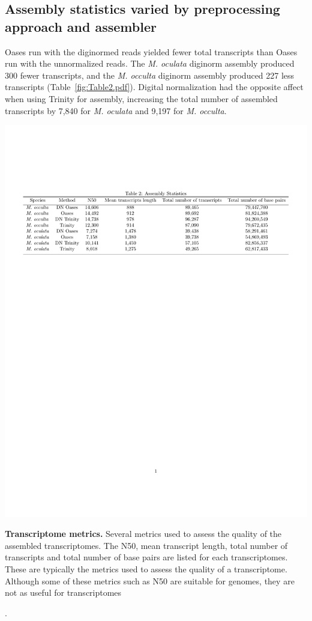 \documentclass[fleqn,10pt]{wlpeerj}
\begin{document}
\subsection{Assembly statistics varied by preprocessing approach and assembler}
Oases run with the diginormed reads yielded fewer total transcripts than Oases run with the unnormalized reads. The \textit{M. oculata} diginorm assembly produced 300 fewer transcripts, and the \textit{M. occulta} diginorm assembly produced 227 less transcripts (Table~\ref{fig:Table2.pdf}). Digital normalization had the opposite affect when using Trinity for assembly, increasing the total number of assembled transcripts by 7,840 for \textit{M. oculata} and 9,197 for \textit{M. occulta}.

\begin{table}[tbp]
\centering
\includegraphics[width=\linewidth]{Table2.pdf}
\caption{\textbf{Transcriptome metrics.} Several metrics used to assess the quality of the assembled transcriptomes. The N50, mean transcript length, total number of transcripts and total number of base pairs are listed for each transcriptomes. These are typically the metrics used to assess the quality of a transcriptome. Although some of these metrics such as N50 are suitable for genomes, they are not as useful for transcriptomes}.
\label{fig:Table2.pdf}
\end{table}
   
\end{document}
